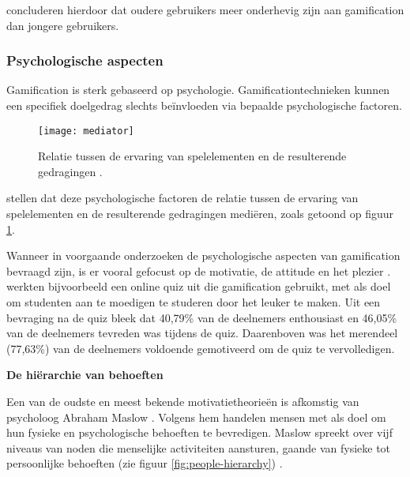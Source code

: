 \textcite{PoloPena2020} concluderen hierdoor dat oudere gebruikers meer onderhevig zijn aan gamification dan jongere gebruikers.

\subsubsection{Psychologische aspecten}
Gamification is sterk gebaseerd op psychologie.
Gamificationtechnieken kunnen een specifiek doelgedrag slechts beïnvloeden via bepaalde psychologische factoren.


\begin{figure}[h]
    \caption[Relatie tussen de ervaring van spelelementen en de resulterende gedragingen]{Relatie tussen de ervaring van spelelementen en de resulterende gedragingen \autocite{Kam2018}.}
    \texttt{[image: mediator]}
    \label{fig:mediator}
\end{figure}

\textcite{Landers2011} stellen dat deze psychologische factoren de relatie tussen de ervaring van spelelementen en de resulterende gedragingen mediëren, zoals getoond op figuur \ref{fig:mediator}.

Wanneer in voorgaande onderzoeken de psychologische aspecten van gamification bevraagd zijn, is er vooral gefocust op de motivatie, de attitude en het plezier \autocite{Hamari2014}. \textcite{Cheong2013} werkten bijvoorbeeld een online quiz uit die gamification gebruikt, met als doel om studenten aan te moedigen te studeren door het leuker te maken. Uit een bevraging  na de quiz bleek dat 40,79\% van de deelnemers enthousiast en 46,05\% van de deelnemers tevreden was tijdens de quiz. Daarenboven was het merendeel (77,63\%) van de deelnemers voldoende gemotiveerd om de quiz te vervolledigen.


\vspace{2mm}
\textbf{De hiërarchie van behoeften}
\vspace{1mm}

Een van de oudste en meest bekende motivatietheorieën is afkomstig van psycholoog Abraham Maslow \autocite{Richter2014}. Volgens hem handelen mensen met als doel om hun fysieke en psychologische behoeften te bevredigen. Maslow spreekt over vijf niveaus van noden die menselijke activiteiten aansturen, gaande van fysieke tot persoonlijke behoeften (zie figuur \ref{fig:people-hierarchy}) \autocite{Lilienfeld2014}.

